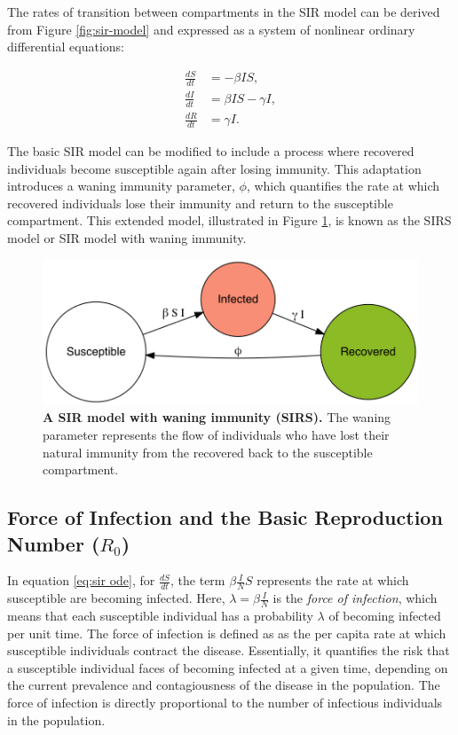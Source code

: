 \documentclass[
11pt, %
oneside, %
english, %
singlespacing, %
]{macthesis} %
\begin{document}
The rates of transition between compartments in the SIR model can be derived from Figure \ref{fig:sir-model} and expressed as a system of nonlinear ordinary differential equations:

\begin{equation}
\begin{aligned}
\frac{dS}{dt} &= -\beta IS, \\
\frac{dI}{dt} &= \beta IS - \gamma I, \\
\frac{dR}{dt} &= \gamma I.
\end{aligned}
\label{eq:sir ode}
\end{equation}

The basic SIR model can be modified to include a process where recovered individuals become susceptible again after losing immunity. This adaptation introduces a waning immunity parameter, \(\phi\), which quantifies the rate at which recovered individuals lose their immunity and return to the susceptible compartment. This extended model, illustrated in Figure \ref{fig:sirs}, is known as the SIRS model or SIR model with waning immunity.

\begin{figure}[H]
\centering
\includegraphics[width=\textwidth]{figure/sirs_model.png}
\caption[Susceptible-Infected-Recovered-Susceptible (SIRS) model]{\textbf{A SIR model with waning immunity (SIRS).} The waning parameter represents the flow of individuals who have lost their natural immunity from the recovered back to the susceptible compartment.}
\label{fig:sirs}
\end{figure}

\subsection{\texorpdfstring{Force of Infection and the Basic Reproduction Number (\(R_0\))}{Force of Infection and the Basic Reproduction Number (R\_0)}}\label{FOI-and-R0}

In equation \ref{eq:sir ode}, for \(\frac{dS}{dt}\), the term \(\beta \frac{I}{N} S\) represents the rate at which susceptible are becoming infected. Here, \(\lambda = \beta \frac{I}{N}\) is the \emph{force of infection}, which means that each susceptible individual has a probability \(\lambda\) of becoming infected per unit time. The force of infection is defined as as the per capita rate at which susceptible individuals contract the disease. Essentially, it quantifies the risk that a susceptible individual faces of becoming infected at a given time, depending on the current prevalence and contagiousness of the disease in the population. The force of infection is directly proportional to the number of infectious individuals in the population.
\end{document}

